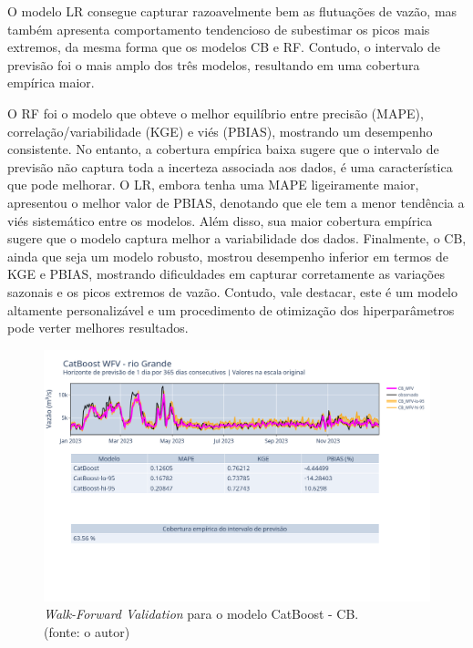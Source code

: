 O modelo LR consegue capturar razoavelmente bem as flutuações de vazão, mas também apresenta comportamento tendencioso de subestimar os picos mais extremos, da mesma forma que os modelos CB e RF. Contudo, o intervalo de previsão foi o mais amplo dos três modelos, resultando em uma cobertura empírica maior.

O RF foi o modelo que obteve o melhor equilíbrio entre precisão (MAPE), correlação/variabilidade (KGE) e viés (PBIAS), mostrando um desempenho consistente. No entanto, a cobertura empírica baixa sugere que o intervalo de previsão não captura toda a incerteza associada aos dados, é uma característica que pode melhorar. O LR, embora tenha uma MAPE ligeiramente maior, apresentou o melhor valor de PBIAS, denotando que ele tem a menor tendência a viés sistemático entre os modelos. Além disso, sua maior cobertura empírica sugere que o modelo captura melhor a variabilidade dos dados. Finalmente, o CB, ainda que seja um modelo robusto, mostrou desempenho inferior em termos de KGE e PBIAS, mostrando dificuldades em capturar corretamente as variações sazonais e os picos extremos de vazão. Contudo, vale destacar, este é um modelo altamente personalizável e um procedimento de otimização dos hiperparâmetros pode verter melhores resultados.

\begin{figure}[!h]
	\centering
	\includegraphics[scale=0.33]{Figuras/rio_grande/wfv/CB/CB_WFV_ORIG.png}
	\caption{\textit{Walk-Forward Validation} para o modelo CatBoost - CB.\\(fonte: o autor)}
	\label{fig:grande_CB_WFV_ORIG}
\end{figure}

